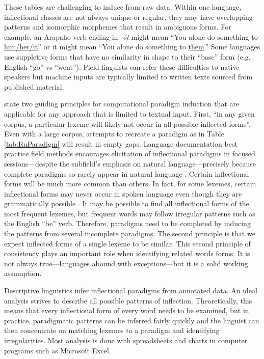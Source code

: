 \documentclass[12pt]{article}
\begin{document}
These tables are challenging to induce from raw data. Within one language, inflectional classes are not always unique or regular, they may have overlapping patterns and isomorphic morphemes that result in ambiguous forms. For example, an Arapaho verb ending in \textit{-\'ot} might mean ``You alone do something to \underline{him/her/it}'' or it might mean ``You alone do something to \underline{them}.'' Some languages use suppletive forms that have no similarity in shape to their ``base'' form (e.g. English ``go'' vs ``went''). Field linguists can refer these difficulties to native speakers but machine inputs are typically limited to written texts sourced from published material.

 state two guiding principles for computational paradigm induction that are applicable for any approach that is limited to textual input. First, ``in any given corpus, a particular lexeme will likely not occur in all possible inflected forms''.  Even with a large corpus, attempts to recreate a paradigm as in Table \ref{tab:RuParadigm} will result in empty gaps. Language documentation best practice field methods encourages elicitation of inflectional paradigms in focused sessions---despite the subfield's emphasis on natural language---precisely because complete paradigms so rarely appear in natural language \cite{lupke_data_2010}. Certain inflectional forms will be much more common than others. In fact, for some lexemes, certain inflectional forms may never occur in spoken language even though they are grammatically possible \cite{silfverberg_encoder-decoder_2018}. It may be possible to find all inflectional forms of the most frequent lexemes, but frequent words may follow irregular patterns such as the English ``be'' verb. Therefore, paradigms need to be completed by inducing the patterns from several incomplete paradigms. The second principle is that we expect inflected forms of a single lexeme to be similar. This second principle of consistency plays an important role when identifying related words forms. It is not always true---languages abound with exceptions---but it is a solid working assumption.  

Descriptive linguistics infer inflectional paradigms from annotated data. An ideal analysis strives to describe all possible patterns of inflection. Theoretically, this means that every inflectional form of every word needs to be examined, but in practice, paradigmatic patterns can be inferred fairly quickly and the linguist can then concentrate on matching lexemes to a paradigm and identifying irregularities. Most analysis is done with spreadsheets and charts in computer programs such as Microsoft Excel. 
\end{document}
